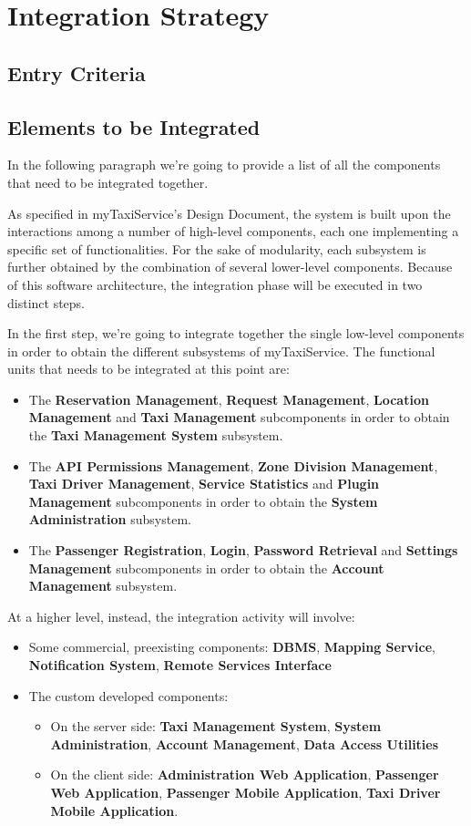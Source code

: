 \chapter{Integration Strategy}
\section{Entry Criteria}
\section{Elements to be Integrated}
In the following paragraph we're going to provide a list of all the components that need to be integrated together.

As specified in myTaxiService's Design Document, the system is built upon the interactions among a number of high-level components, each one implementing a specific set of functionalities. For the sake of modularity, each subsystem is further obtained by the combination of several lower-level components.
Because of this software architecture, the integration phase will be executed in two distinct steps. 

In the first step, we're going to integrate together the single low-level components in order to obtain the different subsystems of myTaxiService. The functional units that needs to be integrated at this point are:
\begin{itemize}
	\item The \textbf{Reservation Management}, \textbf{Request Management}, \textbf{Location Management} and \textbf{Taxi Management} subcomponents in order to obtain the \textbf{Taxi Management System} subsystem.
	\item The \textbf{API Permissions Management}, \textbf{Zone Division Management}, \textbf{Taxi Driver Management}, \textbf{Service Statistics} and \textbf{Plugin Management} subcomponents in order to obtain the \textbf{System Administration} subsystem.
	\item The \textbf{Passenger Registration}, \textbf{Login}, \textbf{Password Retrieval} and \textbf{Settings Management} subcomponents in order to obtain the \textbf{Account Management} subsystem.
\end{itemize}
At a higher level, instead, the integration activity will involve:
\begin{itemize}
	\item Some commercial, preexisting components: \textbf{DBMS}, \textbf{Mapping Service}, \textbf{Notification System}, \textbf{Remote Services Interface}
	\item The custom developed components: 
		\begin{itemize}
		\item On the server side: \textbf{Taxi Management System}, \textbf{System Administration}, \textbf{Account Management}, \textbf{Data Access Utilities}
		\item On the client side: \textbf{Administration Web Application}, \textbf{Passenger Web Application}, \textbf{Passenger Mobile Application}, \textbf{Taxi Driver Mobile Application}.
		\end{itemize}
\end{itemize}
 
